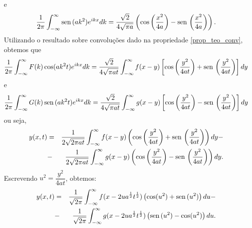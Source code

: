 e
\begin{equation*}
\frac{1}{2\pi}\int_{-\infty}^\infty \operatorname{sen}\, (ak^2)e^{ik
x}dk=\frac{\sqrt{2}}{4\sqrt{\pi a}}\left(\cos\left( \frac{x^2}{4a}\right)-\operatorname{sen}\,\left(
\frac{x^2}{4a}\right)\right).
\end{equation*}
Utilizando o resultado sobre convoluções dado na propriedade \ref{prop_teo_conv}, obtemos que
\begin{equation*}
\frac{1}{2\pi}\int_{-\infty}^\infty F(k)\cos (ak^2
t)e^{ik x}dk=\frac{\sqrt{2}}{4\sqrt{\pi a t}}\int_{-\infty}^\infty
f(x-y)\left[\cos \left(\frac{y^2}{4at}\right)+\operatorname{sen}\,\left( \frac{y^2}{4at}\right)\right]dy
\end{equation*}
e 
\begin{equation*}
\frac{1}{2\pi}\int_{-\infty}^\infty G(k)\operatorname{sen}\, (ak^2
t)e^{ik x}dk=\frac{\sqrt{2}}{4\sqrt{\pi a t}}\int_{-\infty}^\infty
g(x-y)\left[\cos \left(\frac{y^2}{4at}\right)-\operatorname{sen}\,\left( \frac{y^2}{4at}\right)\right]dy
\end{equation*}
ou seja,
\begin{eqnarray*}
y(x,t)&=&\frac{1}{2\sqrt{2\pi a t}}\int_{-\infty}^\infty
f(x-y)\left(\cos\left( \frac{y^2}{4at}\right)+\operatorname{sen}\,\left( \frac{y^2}{4at}\right)\right)dy-\\
&-&\frac{1}{2\sqrt{2\pi a t}}\int_{-\infty}^\infty
g(x-y)\left(\cos \left(\frac{y^2}{4at}\right)-\operatorname{sen}\,\left( \frac{y^2}{4at}\right)\right)dy.
\end{eqnarray*}
Escrevendo $u^2=\dfrac{y^2}{4at}$, obtemos:
\begin{eqnarray*}
y(x,t)&=&\frac{1}{\sqrt{2\pi}}\int_{-\infty}^\infty
f(x-2u a^{\frac{1}{2}}t^{\frac{1}{2}})\left(\cos (u^2)+\operatorname{sen}\, (u^2)\right)du-\\
&-&\frac{1}{\sqrt{2\pi}}\int_{-\infty}^\infty g(x-2u
a^{\frac{1}{2}}t^{\frac{1}{2}})\left(\operatorname{sen}\, (u^2)-\cos (u^2)\right)du.
\end{eqnarray*}
